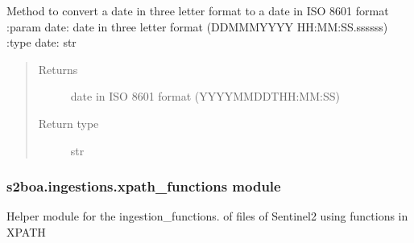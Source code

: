 
\begin{fulllineitems}
\label{\detokenize{s2boa.ingestions:s2boa.ingestions.functions.obtain_polygon_format}}
\end{fulllineitems}


\begin{fulllineitems}
\label{\detokenize{s2boa.ingestions:s2boa.ingestions.functions.three_letter_to_iso_8601}}
Method to convert a date in three letter format to a date in ISO 8601 format
:param date: date in three letter format (DD\sphinxhyphen{}MMM\sphinxhyphen{}YYYY HH:MM:SS.ssssss)
:type date: str
\begin{quote}\begin{description}
\item[{Returns}] \leavevmode
date in ISO 8601 format (YYYY\sphinxhyphen{}MM\sphinxhyphen{}DDTHH:MM:SS)

\item[{Return type}] \leavevmode
str

\end{description}\end{quote}

\end{fulllineitems}



\subsubsection{s2boa.ingestions.xpath\_functions module}
\label{\detokenize{s2boa.ingestions:module-s2boa.ingestions.xpath_functions}}\label{\detokenize{s2boa.ingestions:s2boa-ingestions-xpath-functions-module}}
Helper module for the ingestion\_functions. of files of Sentinel\sphinxhyphen{}2 using functions in XPATH

